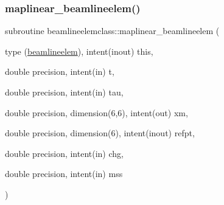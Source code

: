 \subsubsection{\texorpdfstring{maplinear\_beamlineelem()}{maplinear\_beamlineelem()}}
{\footnotesize\ttfamily subroutine beamlineelemclass\+::maplinear\+\_\+beamlineelem (\begin{DoxyParamCaption}\item[{type (\mbox{\hyperlink{namespacebeamlineelemclass_structbeamlineelemclass_1_1beamlineelem}{beamlineelem}}), intent(inout)}]{this,  }\item[{double precision, intent(in)}]{t,  }\item[{double precision, intent(in)}]{tau,  }\item[{double precision, dimension(6,6), intent(out)}]{xm,  }\item[{double precision, dimension(6), intent(inout)}]{refpt,  }\item[{double precision, intent(in)}]{chg,  }\item[{double precision, intent(in)}]{mss }\end{DoxyParamCaption})}

